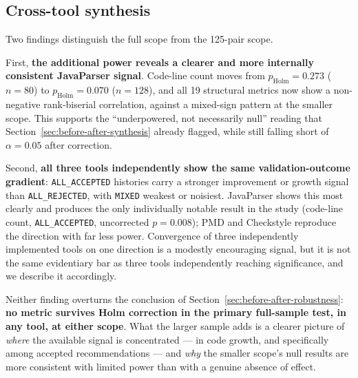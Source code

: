 \subsection{Cross-tool synthesis}
\label{sec:ba-full-synthesis}

Two findings distinguish the full scope from the 125-pair scope.

First, \textbf{the additional power reveals a clearer and more internally consistent JavaParser signal}.
Code-line count moves from $p_{\text{Holm}}=0.273$ ($n=80$) to $p_{\text{Holm}}=0.070$ ($n=128$), and all 19 structural metrics now show a non-negative rank-biserial correlation, against a mixed-sign pattern at the smaller scope.
This supports the ``underpowered, not necessarily null'' reading that Section~\ref{sec:before-after-synthesis} already flagged, while still falling short of $\alpha=0.05$ after correction.

Second, \textbf{all three tools independently show the same validation-outcome gradient}: \texttt{ALL\_ACCEPTED} histories carry a stronger improvement or growth signal than \texttt{ALL\_REJECTED}, with \texttt{MIXED} weakest or noisiest.
JavaParser shows this most clearly and produces the only individually notable result in the study (code-line count, \texttt{ALL\_ACCEPTED}, uncorrected $p=0.008$); PMD and Checkstyle reproduce the direction with far less power.
Convergence of three independently implemented tools on one direction is a modestly encouraging signal, but it is not the same evidentiary bar as three tools independently reaching significance, and we describe it accordingly.

Neither finding overturns the conclusion of Section~\ref{sec:before-after-robustness}: \textbf{no metric survives Holm correction in the primary full-sample test, in any tool, at either scope}.
What the larger sample adds is a clearer picture of \emph{where} the available signal is concentrated --- in code growth, and specifically among accepted recommendations --- and \emph{why} the smaller scope's null results are more consistent with limited power than with a genuine absence of effect.


